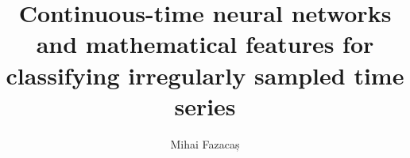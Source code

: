 \documentclass{amsart}
\makeatletter
\def\@crcategories{}
\newcommand{\crcategories}[1]{\def\@crcategories{#1}}
\makeatother
\begin{document}
\title[Continuous-time models for irregular time series]{Continuous-time
neural networks and mathematical features for classifying irregularly
sampled time series}

\author{Mihai Fazacaș}
\address{Faculty of Mathematics and Computer Science,
Babeș-Bolyai University, \newline Cluj-Napoca, Romania}

\crcategories{I.2.6 [Artificial Intelligence]: Learning -- Connectionism and
neural nets; I.5.2 [Pattern Recognition]: Design Methodology -- Classifier
design and evaluation, Feature evaluation and selection; G.3 [Probability and
Statistics]: Time series analysis}



\maketitle





% 



\end{document}
